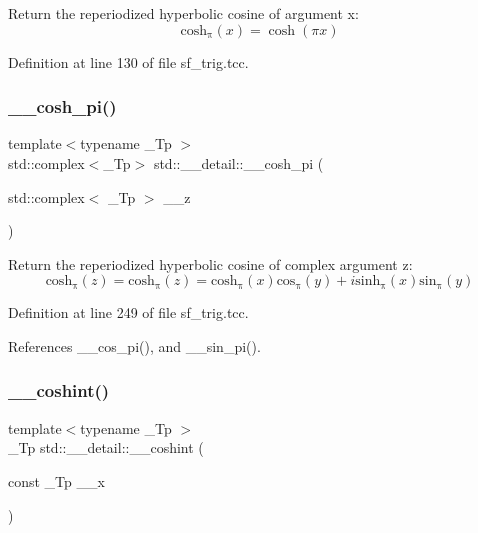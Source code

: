 Return the reperiodized hyperbolic cosine of argument x\+: \[ \mathrm{cosh_\pi}(x) = \cosh(\pi x) \] 

Definition at line 130 of file sf\+\_\+trig.\+tcc.

\mbox{\label{namespacestd_1_1____detail_a257e13bd4fa9711a87ea68a783ee40d9}} 
\subsubsection{\texorpdfstring{\+\_\+\+\_\+cosh\+\_\+pi()}{\_\_cosh\_pi()}\hspace{0.1cm}{\footnotesize\ttfamily [2/2]}}
{\footnotesize\ttfamily template$<$typename \+\_\+\+Tp $>$ \\
std\+::complex$<$\+\_\+\+Tp$>$ std\+::\+\_\+\+\_\+detail\+::\+\_\+\+\_\+cosh\+\_\+pi (\begin{DoxyParamCaption}\item[{std\+::complex$<$ \+\_\+\+Tp $>$}]{\+\_\+\+\_\+z }\end{DoxyParamCaption})}

Return the reperiodized hyperbolic cosine of complex argument z\+: \[ \mathrm{cosh_\pi}(z) = \mathrm{cosh_\pi}(z) = \mathrm{cosh_\pi}(x) \mathrm{cos_\pi}(y) + i \mathrm{sinh_\pi}(x) \mathrm{sin_\pi}(y) \] 

Definition at line 249 of file sf\+\_\+trig.\+tcc.



References \+\_\+\+\_\+cos\+\_\+pi(), and \+\_\+\+\_\+sin\+\_\+pi().

\mbox{\label{namespacestd_1_1____detail_ad48a89a591f7b58a047f072e6e383663}} 
\subsubsection{\texorpdfstring{\+\_\+\+\_\+coshint()}{\_\_coshint()}}
{\footnotesize\ttfamily template$<$typename \+\_\+\+Tp $>$ \\
\+\_\+\+Tp std\+::\+\_\+\+\_\+detail\+::\+\_\+\+\_\+coshint (\begin{DoxyParamCaption}\item[{const \+\_\+\+Tp}]{\+\_\+\+\_\+x }\end{DoxyParamCaption})}



